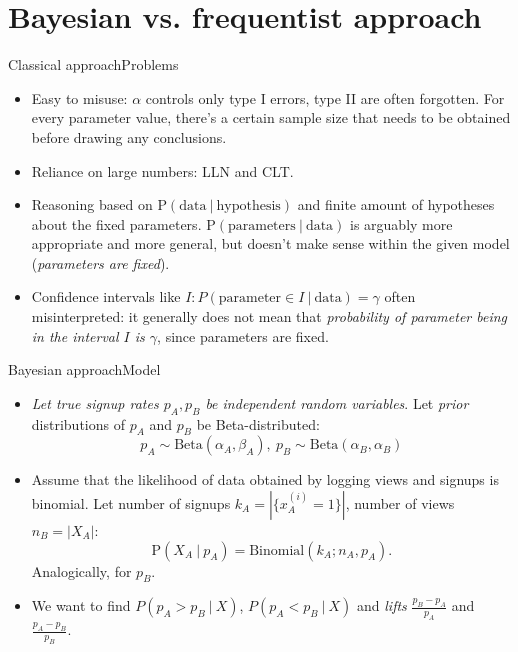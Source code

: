 \documentclass[pdf]{beamer}
\begin{document}
\section{Bayesian vs. frequentist approach }


\begin{frame}{Classical approach}{Problems}

\begin{itemize}
	\item Easy to misuse: $\alpha$ controls only type I errors, type II are often forgotten. For every parameter value, there's a certain sample size that needs to be obtained before drawing any conclusions.
	\item Reliance on large numbers: LLN and CLT.
	\item Reasoning based on $\text{P}(\text{data}~ | ~\text{hypothesis})$ and finite amount of hypotheses about the fixed parameters. $\text{P}(\text{parameters}~ | ~\text{data})$ is arguably more appropriate and more general, but doesn't make sense within the given model (\emph{parameters are fixed}).
	\item Confidence intervals like $I: P(\text{parameter} \in I ~|~\text{data}) = \gamma $ often misinterpreted: it generally does not mean that \emph{probability of parameter being in the interval $I$ is $\gamma$}, since parameters are fixed.
\end{itemize}

\end{frame}


\begin{frame}{Bayesian approach}{Model}

	\begin{itemize}
		\item \emph{Let true signup rates $p_A, p_B$ be independent random variables}. Let \emph{prior} distributions of $p_A$ and $p_B$ be Beta-distributed:
		$$ p_A \sim \text{Beta}(\alpha_A, \beta_A),\ p_B \sim \text{Beta}(\alpha_B, \alpha_B) $$
												
		\item Assume that the likelihood of data obtained by logging views and signups is binomial. Let number of signups $k_A = |\{x_A^{(i)}=1\}|$, number of views $n_B = |X_A|$:
		$$ \text{P}(X_A ~|~ p_A) = \text{Binomial}(k_A; n_A, p_A).  $$
		Analogically, for $p_B$.
		\item We want to find $P(p_A > p_B ~|~X)$, $P(p_A < p_B ~|~ X)$ and \emph{lifts} $\frac{p_B - p_A}{p_A}$ and $\frac{p_A - p_B}{p_B}$.
	\end{itemize}

\end{frame}
\end{document}
